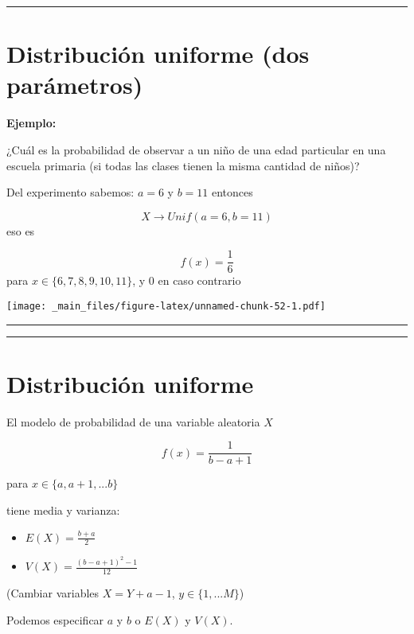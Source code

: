 \documentclass[
]{book}
\begin{document}
\begin{center}\rule{0.5\linewidth}{0.5pt}\end{center}

\hypertarget{distribuciuxf3n-uniforme-dos-paruxe1metros-1}{%
\section{Distribución uniforme (dos parámetros)}\label{distribuciuxf3n-uniforme-dos-paruxe1metros-1}}

\textbf{Ejemplo:}

¿Cuál es la probabilidad de observar a un niño de una edad particular en una escuela primaria (si todas las clases tienen la misma cantidad de niños)?

Del experimento sabemos: \(a=6\) y \(b=11\) entonces

\[X \rightarrow Unif(a=6, b=11)\] eso es

\[f(x)=\frac{1}{6}\] para \(x\in \{6,7,8,9,10,11\}\), y \(0\) en caso contrario

\texttt{[image: \_main\_files/figure-latex/unnamed-chunk-52-1.pdf]}

\begin{center}\rule{0.5\linewidth}{0.5pt}\end{center}

\begin{center}\rule{0.5\linewidth}{0.5pt}\end{center}

\hypertarget{distribuciuxf3n-uniforme-1}{%
\section{Distribución uniforme}\label{distribuciuxf3n-uniforme-1}}

El modelo de probabilidad de una variable aleatoria \(X\)

\[f(x)=\frac{1}{b-a+1}\]

para \(x \in \{a, a+1, ...b\}\)

tiene media y varianza:

\begin{itemize}
\item
  \(E(X)= \frac{b+a}{2}\)
\item
  \(V(X)= \frac{(b-a+1)^2-1}{12}\)
\end{itemize}

(Cambiar variables \(X=Y+a-1\), \(y \in \{1,...M\}\))

Podemos especificar \(a\) y \(b\) o \(E(X)\) y \(V(X)\).
\end{document}
